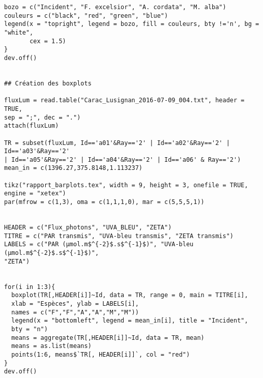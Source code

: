 \documentclass[12pt]{report}
\begin{document}
\begin{verbatim}
bozo = c("Incident", "F. excelsior", "A. cordata", "M. alba")
couleurs = c("black", "red", "green", "blue")
legend(x = "topright", legend = bozo, fill = couleurs, bty !='n', bg = "white",
       cex = 1.5)
}
dev.off()


## Création des boxplots

fluxLum = read.table("Carac_Lusignan_2016-07-09_004.txt", header = TRUE,
sep = ";", dec = ".")
attach(fluxLum)

TR = subset(fluxLum, Id=='a01'&Ray=='2' | Id=='a02'&Ray=='2' | Id=='a03'&Ray=='2'
| Id=='a05'&Ray=='2' | Id=='a04'&Ray=='2' | Id=='a06' & Ray=='2')
mean_in = c(1396.27,375.8148,1.113237)

tikz("rapport_barplots.tex", width = 9, height = 3, onefile = TRUE,
engine = "xetex")
par(mfrow = c(1,3), oma = c(1,1,1,0), mar = c(5,5,5,1))


HEADER = c("Flux_photons", "UVA_BLEU", "ZETA")
TITRE = c("PAR transmis", "UVA-bleu transmis", "ZETA transmis")
LABELS = c("PAR (µmol.m$^{-2}$.s$^{-1}$)", "UVA-bleu (µmol.m$^{-2}$.s$^{-1}$)",
"ZETA")


for(i in 1:3){
  boxplot(TR[,HEADER[i]]~Id, data = TR, range = 0, main = TITRE[i],
  xlab = "Espèces", ylab = LABELS[i],
  names = c("F","F","A","A","M","M"))
  legend(x = "bottomleft", legend = mean_in[i], title = "Incident",
  bty = "n")
  means = aggregate(TR[,HEADER[i]]~Id, data = TR, mean)
  means = as.list(means)
  points(1:6, means$`TR[, HEADER[i]]`, col = "red")
}
dev.off()
\end{verbatim}
\end{document}
